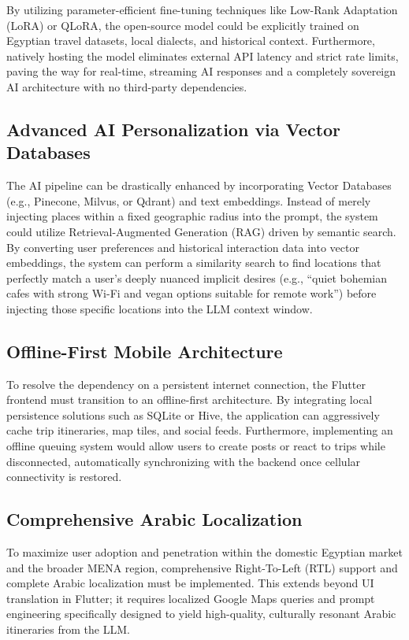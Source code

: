 By utilizing parameter-efficient fine-tuning techniques like Low-Rank Adaptation (LoRA) or QLoRA, the open-source model could be explicitly trained on Egyptian travel datasets, local dialects, and historical context. Furthermore, natively hosting the model eliminates external API latency and strict rate limits, paving the way for real-time, streaming AI responses and a completely sovereign AI architecture with no third-party dependencies.

\subsection{Advanced AI Personalization via Vector Databases}
The AI pipeline can be drastically enhanced by incorporating Vector Databases (e.g., Pinecone, Milvus, or Qdrant) and text embeddings. Instead of merely injecting places within a fixed geographic radius into the prompt, the system could utilize Retrieval-Augmented Generation (RAG) driven by semantic search. By converting user preferences and historical interaction data into vector embeddings, the system can perform a similarity search to find locations that perfectly match a user's deeply nuanced implicit desires (e.g., ``quiet bohemian cafes with strong Wi-Fi and vegan options suitable for remote work'') before injecting those specific locations into the LLM context window.

\subsection{Offline-First Mobile Architecture}
To resolve the dependency on a persistent internet connection, the Flutter frontend must transition to an offline-first architecture. By integrating local persistence solutions such as SQLite or Hive, the application can aggressively cache trip itineraries, map tiles, and social feeds. Furthermore, implementing an offline queuing system would allow users to create posts or react to trips while disconnected, automatically synchronizing with the backend once cellular connectivity is restored.

\subsection{Comprehensive Arabic Localization}
To maximize user adoption and penetration within the domestic Egyptian market and the broader MENA region, comprehensive Right-To-Left (RTL) support and complete Arabic localization must be implemented. This extends beyond UI translation in Flutter; it requires localized Google Maps queries and prompt engineering specifically designed to yield high-quality, culturally resonant Arabic itineraries from the LLM.

